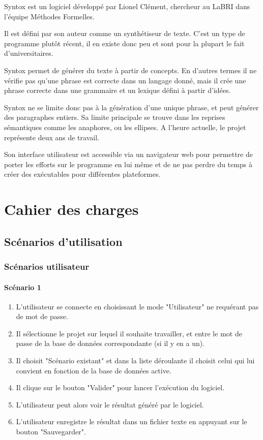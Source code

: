 \documentclass[12pt]{report}
\begin{document}

Syntox \cite{Clem12} est un logiciel développé par Lionel Clément, chercheur au LaBRI dans l'équipe Méthodes Formelles.

Il est défini par son auteur comme un synthétiseur de texte. C'est un type de programme plutôt récent, il en existe donc peu et sont pour la plupart le fait d'universitaires.

Syntox permet de générer du texte à partir de concepts. En d'autres termes il ne vérifie pas qu'une phrase est correcte dans un langage donné, mais il crée une phrase correcte dans une grammaire et un lexique défini à partir d'idées.

Syntox ne se limite donc pas à la génération d'une unique phrase, et peut générer des paragraphes entiers. Sa limite principale se trouve dans les reprises sémantiques comme les anaphores, ou les ellipses.
A l'heure actuelle, le projet représente deux ans de travail.

Son interface utilisateur est accessible via un navigateur web pour permettre de porter les efforts sur le programme en lui même et de ne pas perdre du temps à créer des exécutables pour différentes plateformes. 


\chapter{Cahier des charges}


\section{Scénarios d'utilisation}

\subsection{Scénarios utilisateur}

\subsubsection{Scénario 1}
	\begin{enumerate}
	\item L'utilisateur se connecte en choisissant le mode "Utilisateur" ne requérant pas de mot de passe.
			\item Il sélectionne le projet sur lequel il souhaite travailler, et entre le mot de passe de la base de données correspondante (si il y en a un).
            \item Il choisit "Scénario existant" et dans la liste déroulante il choisit celui qui lui convient en fonction de la base de données active.
            \item Il clique sur le bouton "Valider" pour lancer l'exécution du logiciel.
            \item L'utilisateur peut alors voir le résultat généré par le logiciel.
            \item L'utilisateur enregistre le résultat dans un fichier texte en appuyant sur le bouton "Sauvegarder".
            \end{enumerate}
\end{document}
